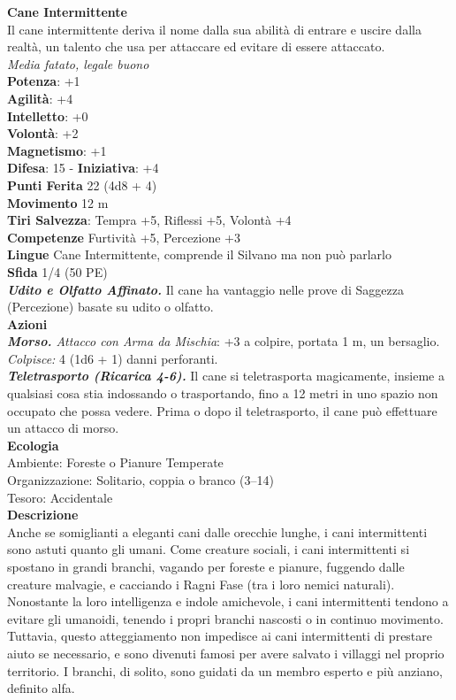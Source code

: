 \begin{multicols}{2}
\medskip\textbf{Cane Intermittente}\\
Il cane intermittente deriva il nome dalla sua abilità di entrare e uscire dalla realtà, un talento che usa per attaccare ed evitare di essere attaccato. \\
\emph{Media fatato, legale buono}\\
\textbf{Potenza}: +1\\
\textbf{Agilità}: +4\\
\textbf{Intelletto}: +0\\
\textbf{Volontà}: +2\\
\textbf{Magnetismo}: +1\\
\textbf{Difesa}: 15 - \textbf{Iniziativa}: +4\\
\textbf{Punti Ferita} 22 (4d8 + 4)\\
\textbf{Movimento} 12 m\\
\textbf{Tiri Salvezza}:  Tempra +5, Riflessi +5, Volontà +4 \\
\textbf{Competenze} Furtività +5, Percezione +3\\
\textbf{Lingue} Cane Intermittente, comprende il Silvano ma non può parlarlo\\
\textbf{Sfida} 1/4 (50 PE)\smallskip\\
\emph{\textbf{Udito e Olfatto Affinato.}} Il cane ha vantaggio nelle prove di Saggezza (Percezione) basate su udito o olfatto.\\
\smallskip\textbf{Azioni}\\
\emph{\textbf{Morso.} Attacco con Arma da Mischia}: +3 a colpire, portata 1 m, un bersaglio.\\
\emph{Colpisce:} 4 (1d6 + 1) danni perforanti.\\
\emph{\textbf{Teletrasporto (Ricarica 4-6).}} Il cane si teletrasporta magicamente, insieme a qualsiasi cosa stia indossando o trasportando, fino a 12 metri in uno spazio non occupato che possa vedere. Prima o dopo il teletrasporto, il cane può effettuare un attacco di morso.\\
\textbf{Ecologia}\\
Ambiente: Foreste o Pianure Temperate\\
Organizzazione: Solitario, coppia o branco (3–14)\\
Tesoro: Accidentale\\
\textbf{Descrizione}\\

Anche se somiglianti a eleganti cani dalle orecchie lunghe, i cani intermittenti sono astuti quanto gli umani. Come creature sociali, i cani intermittenti si spostano in grandi branchi, vagando per foreste e pianure, fuggendo dalle creature malvagie, e cacciando i Ragni Fase (tra i loro nemici naturali). Nonostante la loro intelligenza e indole amichevole, i cani intermittenti tendono a evitare gli umanoidi, tenendo i propri branchi nascosti o in continuo movimento. Tuttavia, questo atteggiamento non impedisce ai cani intermittenti di prestare aiuto se necessario, e sono divenuti famosi per avere salvato i villaggi nel proprio territorio. I branchi, di solito, sono guidati da un membro esperto e più anziano, definito alfa.\\


\end{multicols}
